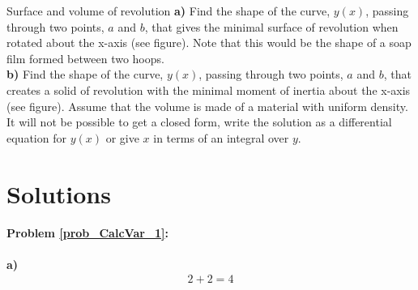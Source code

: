 \begin{problem}{Surface and volume of revolution}\label{prob_CalcVar_9}
\textbf{a)} Find the shape of the curve, $y(x)$, passing through two points, $a$ and $b$, that gives the minimal surface of revolution when rotated about the x-axis (see figure). Note that this would be the shape of a soap film formed between two hoops.\\
\textbf{b)} Find the shape of the curve, $y(x)$, passing through two points, $a$ and $b$, that creates a solid of revolution with the minimal moment of inertia about the x-axis (see figure). Assume that the volume is made of a material with uniform density. It will not be possible to get a closed form, write the solution as a differential equation for $y(x)$ or give $x$ in terms of an integral over $y$.
\\
\end{problem}

\section{Solutions}

\paragraph{Problem \ref{prob_CalcVar_1}:}
\begin{solution}
\textbf{a)}
 \begin{align*}
2+2=4
\end{align*}
\end{solution}


